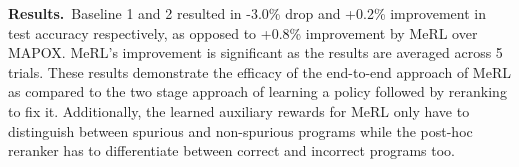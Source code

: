 {\bf Results.}~Baseline 1 and 2 resulted in -3.0\% drop and +0.2\% improvement in test accuracy respectively, as opposed to +0.8\% improvement by MeRL over MAPOX. MeRL's improvement is significant as the results are averaged across 5 trials. These results demonstrate the efficacy of the end-to-end approach of MeRL as compared to the two stage approach of learning a policy followed by reranking to fix it. Additionally, the learned auxiliary rewards for MeRL only have to distinguish between spurious and non-spurious programs while the post-hoc reranker has to differentiate between correct and incorrect programs too.
